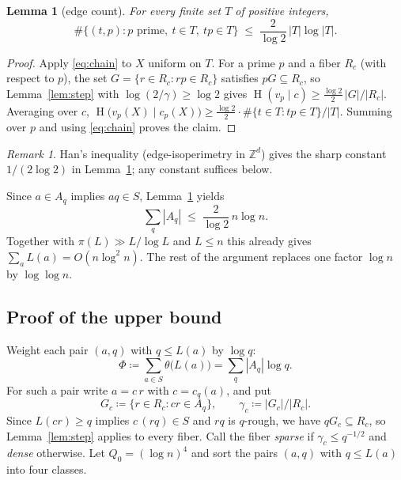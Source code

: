\documentclass[11pt]{article}
\newtheorem{lemma}[theorem]{Lemma}
\theoremstyle{remark}
\newtheorem{remark}[theorem]{Remark}
\DeclareMathOperator{\HH}{H}
\begin{document}
\begin{lemma}[edge count]\label{lem:edges}
For every finite set $T$ of positive integers,
\[
  \#\{(t,p): p \text{ prime},\ t\in T,\ tp\in T\}\;\le\;\frac{2}{\log 2}\,|T|\log|T| .
\]
\end{lemma}

\begin{proof}
Apply \eqref{eq:chain} to $X$ uniform on $T$.
For a prime $p$ and a fiber $R_c$ (with respect to $p$), the set $G=\{r\in R_c: rp\in R_c\}$ satisfies $pG\subseteq R_c$, so Lemma~\ref{lem:step} with $\log(2/\gamma)\ge\log 2$ gives $\HH(v_p\mid c)\ge\frac{\log 2}{2}\,|G|/|R_c|$.
Averaging over $c$, $\HH\bigl(v_p(X)\mid c_p(X)\bigr)\ge\frac{\log2}{2}\cdot\#\{t\in T:tp\in T\}/|T|$.
Summing over $p$ and using \eqref{eq:chain} proves the claim.
\end{proof}

\begin{remark}
Han's inequality (edge-isoperimetry in $\mathbb{Z}^d$) gives the sharp constant $1/(2\log 2)$ in Lemma~\ref{lem:edges}; any constant suffices below.
\end{remark}

Since $a\in A_q$ implies $aq\in S$, Lemma~\ref{lem:edges} yields
\begin{equation}\label{eq:edges}
  \sum_q|A_q|\;\le\;\frac{2}{\log 2}\,n\log n .
\end{equation}
Together with $\pi(L)\gg L/\log L$ and $L\le n$ this already gives $\sum_a L(a)=O(n\log^2 n)$.
The rest of the argument replaces one factor $\log n$ by $\log\log n$.

\subsection{Proof of the upper bound}

Weight each pair $(a,q)$ with $q\le L(a)$ by $\log q$:
\[
  \Phi\coloneqq\sum_{a\in S}\theta\bigl(L(a)\bigr)=\sum_q|A_q|\log q .
\]
For such a pair write $a=c\,r$ with $c=c_q(a)$, and put
\[
  G_c\coloneqq\{r\in R_c : cr\in A_q\},\qquad \gamma_c\coloneqq|G_c|/|R_c| .
\]
Since $L(cr)\ge q$ implies $c\,(rq)\in S$ and $rq$ is $q$-rough, we have $qG_c\subseteq R_c$, so Lemma~\ref{lem:step} applies to every fiber.
Call the fiber \emph{sparse} if $\gamma_c\le q^{-1/2}$ and \emph{dense} otherwise.
Let $Q_0=(\log n)^4$ and sort the pairs $(a,q)$ with $q\le L(a)$ into four classes.
\end{document}
